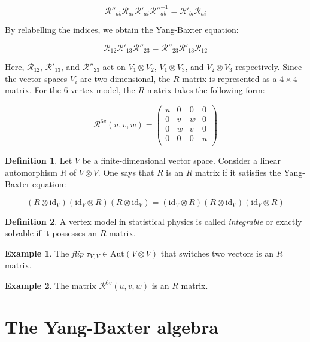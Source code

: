 \documentclass[11pt]{article}
\theoremstyle{definition}
\newtheorem{ex}{Example}[section]
\newtheorem{Def}{Definition}[section]
\begin{document}
\[\mathcal{R}''_{ab}\mathcal{R}_{ai}\mathcal{R}'_{ai}\mathcal{R}''^{-1}_{ab}=\mathcal{R}'_{bi}\mathcal{R}_{ai}\]

By relabelling the indices, we obtain the Yang-Baxter equation:

\[\mathcal{R}_{12}\mathcal{R}'_{13}\mathcal{R}''_{23}=\mathcal{R}''_{23}\mathcal{R}'_{13}\mathcal{R}_{12}\]

Here, \(\mathcal{R}_{12}\), \(\mathcal{R}'_{13}\), and \(\mathcal{R}''_{23}\) act on \(V_{1}\otimes V_{2}\), \(V_{1}\otimes V_{3}\), and \(V_{2}\otimes V_{3}\) respectively. Since the vector spaces \(V_{i}\) are two-dimensional, the \(R\)-matrix is represented as a \(4\times 4\) matrix. For the 6 vertex model, the \(R\)-matrix takes the following form:

\[\mathcal{R}^{6v}(u,v,w)=
\begin{pmatrix}
   u & 0 & 0 & 0 \\
   0 & v & w & 0 \\
   0 & w & v & 0 \\
   0 & 0 & 0 & u \\
\end{pmatrix}
\]

\begin{Def} Let \(V\) be a finite-dimensional vector space. Consider a linear automorphism \(R\) of \(V\otimes V\). One says that \(R\) is an \(R\) matrix if it satisfies the Yang-Baxter equation:

\[(R\otimes \text{id}_{V})(\text{id}_{V}\otimes R)(R\otimes \text{id}_{V})=(\text{id}_{V}\otimes R)(R\otimes \text{id}_{V})(\text{id}_{V}\otimes R)\]
\end{Def}

\begin{Def} A vertex model in statistical physics is called \textit{integrable} or exactly solvable if it possesses an \(R\)-matrix.
\end{Def}

\begin{ex} The \textit{flip} \(\tau_{V,V}\in \text{Aut}(V\otimes V)\) that switches two vectors is an \(R\) matrix.
\end{ex}

\begin{ex} The matrix \(\mathcal{R}^{6v}(u,v,w)\) is an \(R\) matrix.
\end{ex}


\section{\Large \textbf{The Yang-Baxter algebra}} 
\end{document}
